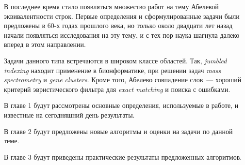 
В последнее время стало появляться множество работ на тему Абелевой эквивалентности строк. Первые определения и сформулированные задачи были предложены в 60-х годах прошлого века, но только около двадцати лет назад начали появляться исследования на эту тему, и с тех пор наука шагнула далеко вперед в этом направлении.

Задачи данного типа встречаются в широком классе областей. Так, \textit{jumbled indexing} находит применение в бионформатике, при решении задач \textit{mass spectrometry} и \textit{gene clusters}. Кроме того, Абелево совпадение слов~--- хороший критерий эвристического фильтра для \textit{exact matching} и поиска с ошибками.

В главе 1 будут рассмотрены основные определения, используемые в работе, и известные на сегодняшний день результаты.

В главе 2 будут предложены новые алгоритмы и оценки на задачи по данной теме.

В главе 3 будут приведены практические результаты предложенных алгоритмов.